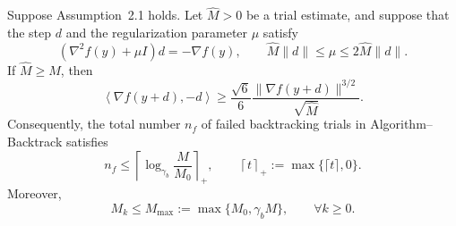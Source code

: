 \begin{itemize}
{              \begin{lemma}
                  \label{lem.adaptive-finite-backtracking}
                  Suppose Assumption~2.1 holds. Let \(\widehat M>0\) be a trial estimate, and suppose that the step \(d\) and the regularization parameter \(\mu\) satisfy
                  \begin{equation}
                      \label{eq.adaptive-ratio}
                      (\nabla^2 f(y)+\mu I)d=-\nabla f(y),
                      \qquad
                      \widehat M\|d\|\le \mu\le 2\widehat M\|d\|.
                  \end{equation}
                  If \(\widehat M\ge M\), then
                  \begin{equation}
                      \label{eq.adaptive-bt-pass}
                      \left\langle \nabla f(y+d),-d\right\rangle
                      \ge
                      \frac{\sqrt 6}{6}
                      \frac{\|\nabla f(y+d)\|^{3/2}}{\sqrt{\widehat M}}.
                  \end{equation}
                  Consequently, the total number \(n_f\) of failed backtracking trials in Algorithm--Backtrack satisfies
                  \begin{equation}
                      \label{eq.nf-bound}
                      n_f
                      \le
                      \left\lceil
                      \log_{\gamma_b}\frac{M}{M_0}
                      \right\rceil_+,
                      \qquad
                      \left\lceil t\right\rceil_+:=\max\{\lceil t\rceil,0\}.
                  \end{equation}
                  Moreover,
                  \begin{equation}
                      \label{eq.Mk-upper}
                      M_k\le M_{\max}:=\max\{M_0,\gamma_b M\},
                      \qquad
                      \forall k\ge0.
                  \end{equation}
              \end{lemma}

}
\end{itemize}
